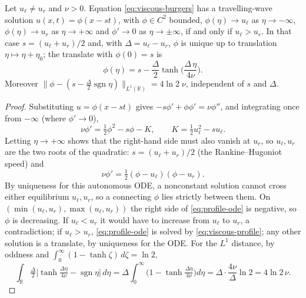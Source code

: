 \begin{proposition}
\label{prop:viscous-profile}
Let $u_\ell\neq u_r$ and $\nu>0$. Equation \eqref{eq:viscous-burgers} has a
travelling-wave solution $u(x,t)=\phi(x-st)$, with $\phi\in C^2$ bounded,
$\phi(\eta)\to u_\ell$ as $\eta\to-\infty$, $\phi(\eta)\to u_r$ as $\eta\to+\infty$
and $\phi'\to0$ as $\eta\to\pm\infty$, if and only if $u_\ell>u_r$. In that case
$s=(u_\ell+u_r)/2$ and, with $\Delta=u_\ell-u_r$, $\phi$ is unique up to
translation $\eta\mapsto\eta+\eta_0$; the translate with $\phi(0)=s$ is
\begin{equation}
  \label{eq:viscous-profile}
  \phi(\eta)=s-\frac{\Delta}{2}\tanh\!\Big(\frac{\Delta\,\eta}{4\nu}\Big).
\end{equation}
Moreover $\|\phi-(s-\tfrac\Delta2\operatorname{sgn}\eta)\|_{L^1(\mathbb{R})}
=4\ln2\;\nu$, independent of $s$ and $\Delta$.
\end{proposition}

\begin{proof}
Substituting $u=\phi(x-st)$ gives $-s\phi'+\phi\phi'=\nu\phi''$, and
integrating once from $-\infty$ (where $\phi'\to0$),
\begin{equation*}
  \nu\phi'=\tfrac12\phi^2-s\phi-K,\qquad K=\tfrac12u_\ell^2-su_\ell .
\end{equation*}
Letting $\eta\to+\infty$ shows that the right-hand side must also vanish at
$u_r$, so $u_\ell,u_r$ are the two roots of the quadratic: $s=(u_\ell+u_r)/2$
(the Rankine--Hugoniot speed) and
\begin{equation}
  \label{eq:profile-ode}
  \nu\phi'=\tfrac12(\phi-u_\ell)(\phi-u_r).
\end{equation}
By uniqueness for this autonomous ODE, a nonconstant solution cannot cross
either equilibrium $u_\ell,u_r$, so a connecting $\phi$ lies strictly between them. On
$(\min(u_\ell,u_r),\max(u_\ell,u_r))$ the right side of \eqref{eq:profile-ode}
is negative, so $\phi$ is decreasing. If $u_\ell<u_r$ it would have to
increase from $u_\ell$ to $u_r$, a contradiction; if $u_\ell>u_r$,
\eqref{eq:profile-ode} is solved by \eqref{eq:viscous-profile}; any other solution is a translate, by
uniqueness for the ODE. For the $L^1$
distance, by oddness and $\int_0^\infty(1-\tanh\zeta)\,d\zeta=\ln2$,
\begin{equation*}
  \int_{\mathbb{R}}\tfrac\Delta2\Big|\tanh\tfrac{\Delta\eta}{4\nu}-\operatorname{sgn}\eta\Big|\,d\eta
  =\Delta\int_0^\infty\Big(1-\tanh\tfrac{\Delta\eta}{4\nu}\Big)d\eta
  =\Delta\cdot\frac{4\nu}{\Delta}\ln2=4\ln2\,\nu .
\end{equation*}
\end{proof}

